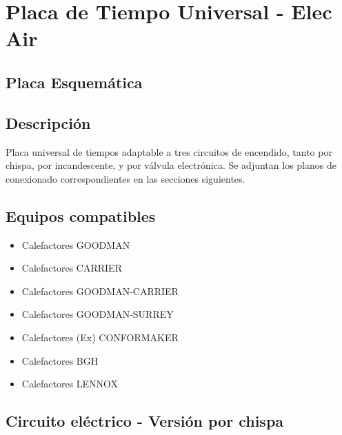 \documentclass{article}
\begin{document}
\section*{Placa de Tiempo Universal - Elec Air}

\subsection*{Placa Esquemática}

\begin{figure}[H]
\centering
\end{figure}

\subsection*{Descripción}

\large{Placa universal de tiempos adaptable a tres circuitos de encendido, tanto por chispa, por incandescente, y por válvula electrónica. Se adjuntan los planos de conexionado correspondientes en las secciones siguientes.}

\subsection*{Equipos compatibles}
\large{
\begin{itemize}
\item Calefactores GOODMAN
\item Calefactores CARRIER
\item Calefactores GOODMAN-CARRIER
\item Calefactores GOODMAN-SURREY
\item Calefactores (Ex) CONFORMAKER
\item Calefactores BGH
\item Calefactores LENNOX
\end{itemize}
}

\newpage

\subsection*{Circuito eléctrico - Versión por chispa}
\end{document}
